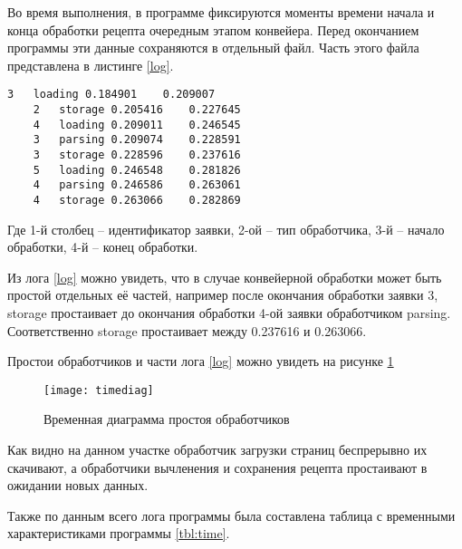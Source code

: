 Во время выполнения, в программе фиксируются моменты времени начала и конца обработки рецепта очередным этапом конвейера. Перед окончанием программы эти данные сохраняются в отдельный файл. Часть этого файла представлена в листинге \ref{log}.

\begin{lstlisting}[label=log, caption={Часть лога, сформированного конвейром}]
	3	loading	0.184901	0.209007
	2	storage	0.205416	0.227645
	4	loading	0.209011	0.246545
	3	parsing	0.209074	0.228591
	3	storage	0.228596	0.237616
	5	loading	0.246548	0.281826
	4	parsing	0.246586	0.263061
	4	storage	0.263066	0.282869
\end{lstlisting}
Где 1-й столбец -- идентификатор заявки, 2-ой -- тип обработчика, 3-й -- начало обработки, 4-й -- конец обработки.

Из лога \ref{log} можно увидеть, что в случае конвейерной обработки может быть простой отдельных её частей, например после окончания обработки заявки 3, storage простаивает до окончания обработки 4-ой заявки обработчиком parsing. Соответственно storage простаивает между 0.237616 и 0.263066.

Простои обработчиков и части лога \ref{log} можно увидеть на рисунке \ref{timediag}

\begin{figure}[h]
	\centering
	\texttt{[image: timediag]}
	\caption{Временная диаграмма простоя обработчиков}
	\label{timediag}
\end{figure}

Как видно на данном участке обработчик загрузки страниц беспрерывно их скачивают, а обработчики вычленения и сохранения рецепта простаивают в ожидании новых данных.

Также по данным всего лога программы была составлена таблица с временными характеристиками программы \ref{tbl:time}.


